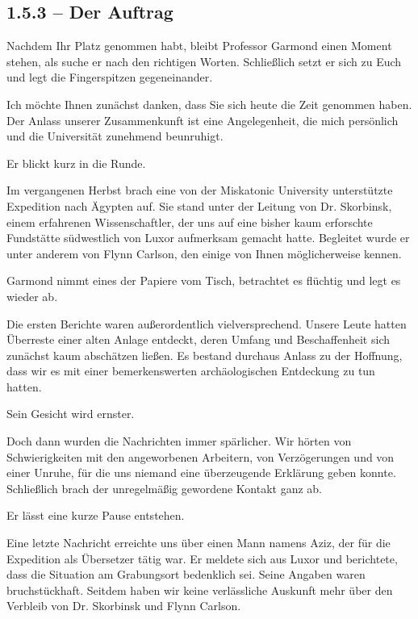 \subsection{1.5.3 -- Der Auftrag}
\begin{vorlesetextalle}
Nachdem Ihr Platz genommen habt, bleibt Professor Garmond einen Moment stehen, als suche er nach den richtigen Worten. Schlie\ss{}lich setzt er sich zu Euch und legt die Fingerspitzen gegeneinander.

\glqq{}Ich möchte Ihnen zunächst danken, dass Sie sich heute die Zeit genommen haben. Der Anlass unserer Zusammenkunft ist eine Angelegenheit, die mich persönlich und die Universität zunehmend beunruhigt.\grqq{}

Er blickt kurz in die Runde.

\glqq{}Im vergangenen Herbst brach eine von der Miskatonic University unterstützte Expedition nach Ägypten auf. Sie stand unter der Leitung von Dr. Skorbinsk, einem erfahrenen Wissenschaftler, der uns auf eine bisher kaum erforschte Fundstätte südwestlich von Luxor aufmerksam gemacht hatte. Begleitet wurde er unter anderem von Flynn Carlson, den einige von Ihnen möglicherweise kennen.\grqq{}

Garmond nimmt eines der Papiere vom Tisch, betrachtet es flüchtig und legt es wieder ab.

\glqq{}Die ersten Berichte waren au\ss{}erordentlich vielversprechend. Unsere Leute hatten Überreste einer alten Anlage entdeckt, deren Umfang und Beschaffenheit sich zunächst kaum abschätzen lie\ss{}en. Es bestand durchaus Anlass zu der Hoffnung, dass wir es mit einer bemerkenswerten archäologischen Entdeckung zu tun hatten.\grqq{}

Sein Gesicht wird ernster.

\glqq{}Doch dann wurden die Nachrichten immer spärlicher. Wir hörten von Schwierigkeiten mit den angeworbenen Arbeitern, von Verzögerungen und von einer Unruhe, für die uns niemand eine überzeugende Erklärung geben konnte. Schlie\ss{}lich brach der unregelmä\ss{}ig gewordene Kontakt ganz ab.\grqq{}

Er lässt eine kurze Pause entstehen.

\glqq{}Eine letzte Nachricht erreichte uns über einen Mann namens Aziz, der für die Expedition als Übersetzer tätig war. Er meldete sich aus Luxor und berichtete, dass die Situation am Grabungsort bedenklich sei. Seine Angaben waren bruchstückhaft. Seitdem haben wir keine verlässliche Auskunft mehr über den Verbleib von Dr. Skorbinsk und Flynn Carlson.\grqq{}


\end{vorlesetextalle}
